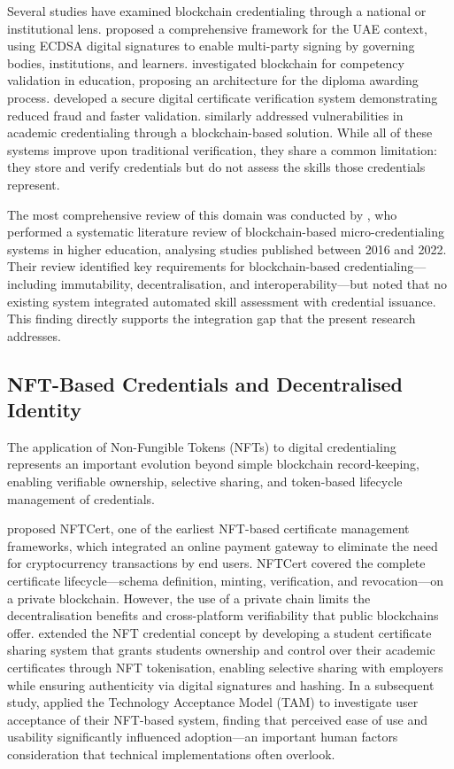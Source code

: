 Several studies have examined blockchain credentialing through a national or institutional lens. \citet{Hemairy2024} proposed a comprehensive framework for the UAE context, using ECDSA digital signatures to enable multi-party signing by governing bodies, institutions, and learners. \citet{Ileana2024} investigated blockchain for competency validation in education, proposing an architecture for the diploma awarding process. \citet{Patel2024} developed a secure digital certificate verification system demonstrating reduced fraud and faster validation. \citet{Noshi2024} similarly addressed vulnerabilities in academic credentialing through a blockchain-based solution. While all of these systems improve upon traditional verification, they share a common limitation: they store and verify credentials but do not assess the skills those credentials represent.

The most comprehensive review of this domain was conducted by \citet{Alsobhi2023}, who performed a systematic literature review of blockchain-based micro-credentialing systems in higher education, analysing studies published between 2016 and 2022. Their review identified key requirements for blockchain-based credentialing---including immutability, decentralisation, and interoperability---but noted that no existing system integrated automated skill assessment with credential issuance. This finding directly supports the integration gap that the present research addresses.

\subsection{NFT-Based Credentials and Decentralised Identity}
\label{sec:NFTCredentials}

The application of Non-Fungible Tokens (NFTs) to digital credentialing represents an important evolution beyond simple blockchain record-keeping, enabling verifiable ownership, selective sharing, and token-based lifecycle management of credentials.

\citet{Zhao2022} proposed NFTCert, one of the earliest NFT-based certificate management frameworks, which integrated an online payment gateway to eliminate the need for cryptocurrency transactions by end users. NFTCert covered the complete certificate lifecycle---schema definition, minting, verification, and revocation---on a private blockchain. However, the use of a private chain limits the decentralisation benefits and cross-platform verifiability that public blockchains offer. \citet{Khati2023} extended the NFT credential concept by developing a student certificate sharing system that grants students ownership and control over their academic certificates through NFT tokenisation, enabling selective sharing with employers while ensuring authenticity via digital signatures and hashing. In a subsequent study, \citet{Khati2025} applied the Technology Acceptance Model (TAM) to investigate user acceptance of their NFT-based system, finding that perceived ease of use and usability significantly influenced adoption---an important human factors consideration that technical implementations often overlook.

